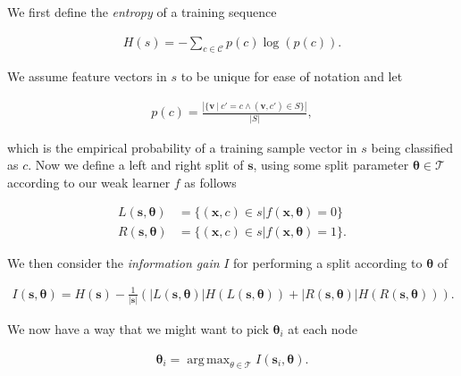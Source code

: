 \documentclass[12pt,twoside,notitlepage]{report}
\newcommand{\vc}[1]{\mathbf{#1}}
\newcommand{\cl}[1]{\mathcal{#1}}
\DeclareMathOperator*{\argmax}{arg\,max}
\begin{document}
            We first define the \textit{entropy} of a training sequence

            \begin{align}
                H(s) = - \sum_{c\in\cl{C}} p(c) \log (p(c)).
            \end{align}

            We assume feature vectors in $s$ to be unique for ease of notation and let

            \begin{align}
                p(c) = \frac{\left| \{\vc{v}\ |\ c' = c \land (\vc{v},c') \in S \} \right|}{\left| S \right|},
                \label{eq:empirical_distribution}
            \end{align}
            
            which is the empirical probability of a training sample vector in $s$ being classified as $c$. Now we define 
            a left and right split of $\vc{s}$, using some split parameter $\vc{\theta} \in \cl{T}$ according to our weak 
            learner $f$ as follows

            \begin{align}
                L(\vc{s},\vc{\theta}) & = \{ (\vc{x}, c) \in s | f(\vc{x}, \vc{\theta}) = 0 \}  \label{eq:left_split}\\
                R(\vc{s},\vc{\theta}) & = \{ (\vc{x}, c) \in s | f(\vc{x}, \vc{\theta}) = 1 \}. \label{eq:right_split}
            \end{align}

            We then consider the \textit{information gain} $I$ for performing a split according to $\vc{\theta}$ of 

            \begin{align}
                I(\vc{s}, \vc{\theta}) = H(\vc{s}) - \frac{1}{|\vc{s}|} \left( |L(\vc{s}, \vc{\theta})| H(L(\vc{s}, \vc{\theta})) 
                                                                          + |R(\vc{s}, \vc{\theta})| H(R(\vc{s}, \vc{\theta})) \right).
                \label{eq:information_gain}
            \end{align} 

            We now have a way that we might want to pick $\vc{\theta}_i$ at each node

            \begin{align} 
                \vc{\theta}_i = \argmax_{\theta\in\cl{T}} I(\vc{s}_i, \vc{\theta}).
            \end{align} 
\end{document}
